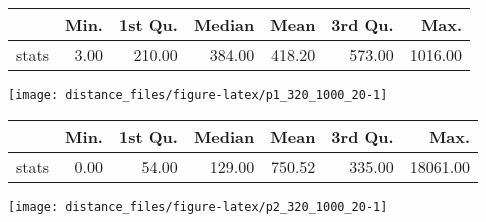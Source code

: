 \documentclass[
  9pt,
  landscape]{article}
\begin{document}
\begin{minipage}{0.5\textwidth} 
\centering 
\begin{tabular}{rrrrrrr}
  \hline
 & Min. & 1st Qu. & Median & Mean & 3rd Qu. & Max. \\ 
  \hline
stats & 3.00 & 210.00 & 384.00 & 418.20 & 573.00 & 1016.00 \\ 
   \hline
\end{tabular}
\vspace{0.5cm} 


\texttt{[image: distance\_files/figure-latex/p1\_320\_1000\_20-1]} 

\end{minipage} 
\begin{minipage}{0.5\textwidth} 
\centering 
\begin{tabular}{rrrrrrr}
  \hline
 & Min. & 1st Qu. & Median & Mean & 3rd Qu. & Max. \\ 
  \hline
stats & 0.00 & 54.00 & 129.00 & 750.52 & 335.00 & 18061.00 \\ 
   \hline
\end{tabular}
\vspace{0.5cm} 


\texttt{[image: distance\_files/figure-latex/p2\_320\_1000\_20-1]} 

\end{minipage}

\pagebreak
\end{document}
